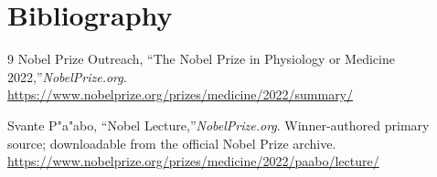\section{Bibliography}

\begin{thebibliography}{9}
Nobel Prize Outreach, ``The Nobel Prize in Physiology or Medicine 2022,''\emph{NobelPrize.org}.\\
\url{https://www.nobelprize.org/prizes/medicine/2022/summary/}

Svante P"a"abo, ``Nobel Lecture,''\emph{NobelPrize.org}. Winner-authored primary source; downloadable from the official Nobel Prize archive.\\
\url{https://www.nobelprize.org/prizes/medicine/2022/paabo/lecture/}
\end{thebibliography}
